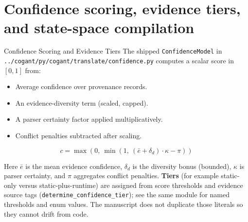 \documentclass[
  ignorenonframetext,
]{beamer}
\author{\texorpdfstring{}{}}
\date{}
\providecommand{\tightlist}{%
  \setlength{\itemsep}{0pt}\setlength{\parskip}{0pt}}
\begin{document}
\section{Confidence scoring, evidence tiers, and state-space
compilation}\label{confidence-scoring-evidence-tiers-and-state-space-compilation}

\begin{frame}[fragile]{Confidence Scoring and Evidence Tiers}
\protect{}\label{confidence-scoring-and-evidence-tiers}
The shipped \texttt{ConfidenceModel} in
\texttt{../cogant/py/cogant/translate/confidence.py} computes a scalar
score in \([0,1]\) from:

\begin{itemize}
\tightlist
\item
  Average confidence over provenance records.
\item
  An evidence-diversity term (scaled, capped).
\item
  A parser certainty factor applied multiplicatively.
\item
  Conflict penalties subtracted after scaling.
\end{itemize}

\begin{equation}
\label{eq:confidence-core}
c = \max\left(0,\ \min\left(1,\ (\bar{e} + \delta_d)\cdot \kappa - \pi\right)\right)
\end{equation}

Here \(\bar{e}\) is the mean evidence confidence, \(\delta_d\) is the
diversity bonus (bounded), \(\kappa\) is parser certainty, and \(\pi\)
aggregates conflict penalties. \textbf{Tiers} (for example static-only
versus static-plus-runtime) are assigned from score thresholds and
evidence source tags (\texttt{determine\_confidence\_tier}); see the
same module for named thresholds and enum values. The manuscript does
not duplicate those literals so they cannot drift from code.
\end{frame}
\end{document}
